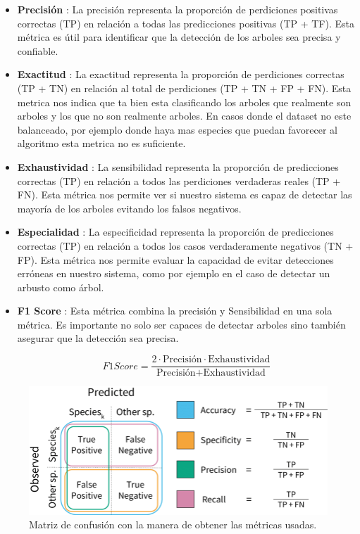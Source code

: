 \begin{itemize}
    \item \textbf{Precisión} : La precisión representa la proporción de perdiciones positivas correctas (TP) en relación a todas las predicciones positivas (TP + TF). Esta métrica es útil para identificar que la detección de los arboles sea precisa y confiable.

    \item \textbf{Exactitud} : La exactitud representa la proporción de perdiciones correctas (TP + TN) en relación al total de perdiciones  (TP + TN + FP + FN). Esta metrica nos indica que ta bien esta clasificando los arboles que realmente son arboles y los que no son realmente arboles. En casos donde el dataset no este balanceado, por ejemplo donde haya mas especies que puedan favorecer al algoritmo esta metrica no es suficiente. 

    \item \textbf{Exhaustividad} : La sensibilidad representa la proporción de predicciones correctas (TP) en relación a todos las perdiciones verdaderas reales (TP + FN). Esta métrica nos permite ver si nuestro sistema es capaz de detectar las mayoría de los arboles evitando los falsos negativos.

    \item \textbf{Especialidad} : La especificidad representa la proporción de predicciones correctas (TP) en relación a todos los casos verdaderamente negativos (TN + FP). Esta métrica nos permite evaluar la capacidad de evitar detecciones erróneas en nuestro sistema, como por ejemplo en el caso de detectar un arbusto como árbol.

    \item \textbf{F1 Score} : Esta métrica combina la precisión y Sensibilidad en una sola métrica. Es importante no solo ser capaces de detectar arboles sino también asegurar que la detección sea precisa.
    
    \[ F1 Score = \frac{2 \cdot \text{Precisión} \cdot \text{Exhaustividad}}{\text{Precisión} + \text{Exhaustividad}} \]

\end{itemize}

\begin{figure}[h]
\centering
    \includegraphics[width=13cm]{imaxes/Model-performance-metrics-Visual-representation-of-the-classification-model-metrics.png}
    \caption{Matriz de confusión con la manera de obtener las métricas usadas.\cite{imgConf}}
    \label{fig:confmatrix}
\end{figure}


